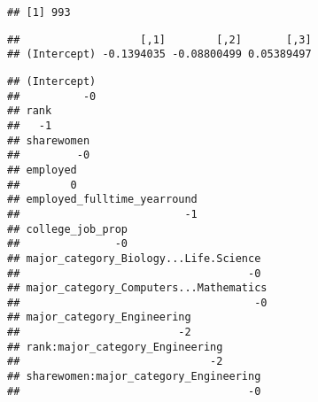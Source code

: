 \documentclass[
]{article}
\newenvironment{Shaded}{\begin{snugshade}}{\end{snugshade}}
\newcommand{\CommentTok}[1]{\textcolor[rgb]{0.56,0.35,0.01}{\textit{#1}}}
\newcommand{\ControlFlowTok}[1]{\textcolor[rgb]{0.13,0.29,0.53}{\textbf{#1}}}
\newcommand{\DecValTok}[1]{\textcolor[rgb]{0.00,0.00,0.81}{#1}}
\newcommand{\KeywordTok}[1]{\textcolor[rgb]{0.13,0.29,0.53}{\textbf{#1}}}
\newcommand{\NormalTok}[1]{#1}
\newcommand{\OperatorTok}[1]{\textcolor[rgb]{0.81,0.36,0.00}{\textbf{#1}}}
\newcommand{\OtherTok}[1]{\textcolor[rgb]{0.56,0.35,0.01}{#1}}
\newcommand{\StringTok}[1]{\textcolor[rgb]{0.31,0.60,0.02}{#1}}
\begin{document}
\begin{verbatim}
## [1] 993
\end{verbatim}

\begin{Shaded}
\end{Shaded}

\begin{verbatim}
##                   [,1]        [,2]       [,3]
## (Intercept) -0.1394035 -0.08800499 0.05389497
\end{verbatim}

\begin{Shaded}
\end{Shaded}

\begin{verbatim}
## (Intercept) 
##          -0 
## rank 
##   -1 
## sharewomen 
##         -0 
## employed 
##        0 
## employed_fulltime_yearround 
##                          -1 
## college_job_prop 
##               -0 
## major_category_Biology...Life.Science 
##                                    -0 
## major_category_Computers...Mathematics 
##                                     -0 
## major_category_Engineering 
##                         -2 
## rank:major_category_Engineering 
##                              -2 
## sharewomen:major_category_Engineering 
##                                    -0
\end{verbatim}
\end{document}
